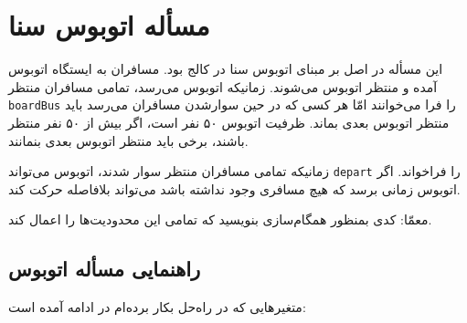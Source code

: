 \documentclass{book}
\newcommand{\clearemptydoublepage}{\newpage\cleardoublepage}
\begin{document}
    

\clearemptydoublepage
\section{مسأله اتوبوس سنا\footnotemark}

    این مسأله در اصل بر مبنای اتوبوس سنا در کالج  بود.
    مسافران به ایستگاه اتوبوس آمده و منتظر اتوبوس می‌شوند. زمانیکه اتوبوس می‌رسد، تمامی مسافران منتظر    {\tt boardBus} را فرا می‌خوانند امّا 
    هر کسی که در حین سوارشدن مسافران می‌رسد باید منتظر اتوبوس بعدی بماند. ظرفیت اتوبوس ۵۰ نفر است، اگر بیش از ۵۰ نفر منتظر باشند، 
    برخی باید منتظر اتوبوس بعدی بنمانند. 

    زمانیکه تمامی مسافران منتظر سوار شدند، اتوبوس می‌تواند  {\tt depart} را فراخواند. 
    اگر اتوبوس زمانی برسد که هیچ مسافری وجود نداشته باشد می‌تواند بلافاصله  حرکت کند. 

    معمّا: کدی بمنظور همگام‌سازی بنویسید که تمامی این محدودیت‌ها را اعمال کند. 


\clearemptydoublepage
\subsection {راهنمایی مسأله اتوبوس}

    متغیرهایی که در راه‌حل بکار برده‌ام در ادامه آمده است: 
\end{document}

